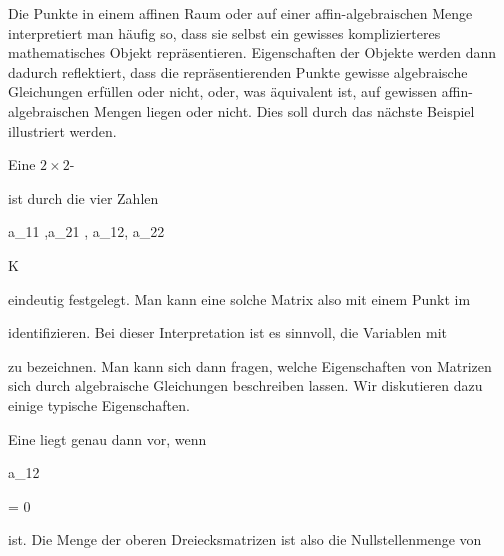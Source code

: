 Die Punkte in einem affinen Raum oder auf einer affin-algebraischen Menge interpretiert man häufig so, dass sie selbst ein gewisses komplizierteres mathematisches Objekt repräsentieren. Eigenschaften der Objekte werden dann dadurch reflektiert, dass die repräsentierenden Punkte gewisse algebraische Gleichungen erfüllen oder nicht, oder, was äquivalent ist, auf gewissen affin-algebraischen Mengen liegen oder nicht. Dies soll durch das nächste Beispiel illustriert werden.




{


Eine
$2 \times 2$-


 {  }


ist durch die vier Zahlen


\mavergleichskette


{\vergleichskette


{ a_{11} ,a_{21} , a_{12}, a_{22}
}


{ \in }{ K
}


{  }{
}


{    }{
}


{   }{
}


}
{}{}{}
eindeutig festgelegt. Man kann eine solche Matrix also mit einem Punkt im


identifizieren. Bei dieser Interpretation ist es sinnvoll, die Variablen mit


 zu bezeichnen. Man kann sich dann fragen, welche Eigenschaften von Matrizen sich durch algebraische Gleichungen beschreiben lassen. Wir diskutieren dazu einige typische Eigenschaften.


Eine
liegt genau dann vor, wenn


\mavergleichskette


{\vergleichskette


{ a_{12}
}


{ = }{ 0
}


{  }{
}


{    }{
}


{   }{
}


}
{}{}{}
ist. Die Menge der oberen Dreiecksmatrizen ist also die Nullstellenmenge von


}

